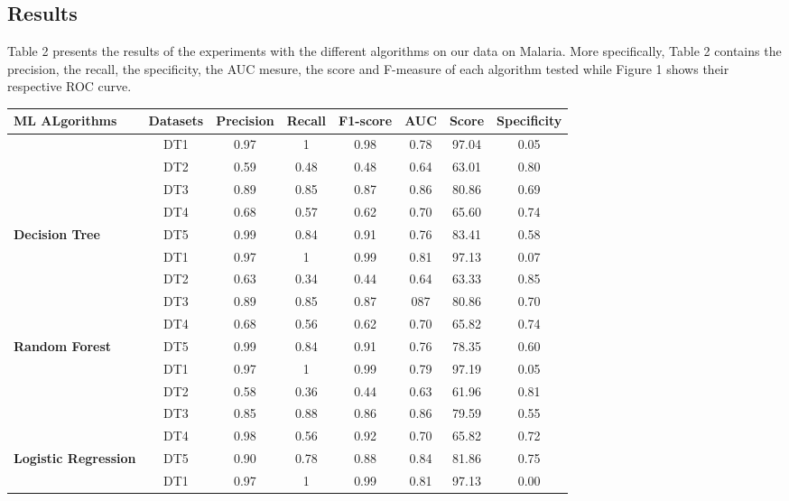 \subsection{Results}
Table 2 presents the results of the experiments with the different algorithms on our data on Malaria. More specifically, Table 2 contains the precision, the recall, the specificity, the AUC mesure, the score and F-measure of each algorithm tested while Figure 1 shows their respective ROC curve.  
\begin{table}
\begin{tabular}{|l|c|c|c|c|c|c|c|}

\hline
\cline{2-8}
 \textbf{ML ALgorithms} &  \textbf{Datasets} & \textbf{Precision} & \textbf{Recall} & \textbf{F1-score}&\textbf{AUC} &\textbf{Score}&\textbf{Specificity}\tabularnewline
\hline
\cline{2-8}
 &  DT1 &0.97  & 1   & 0.98 & 0.78 & 97.04 & 0.05 \\
\cline{2-8}
& DT2 & 0.59 &0.48 &0.48  &0.64  &63.01  &0.80\\
\cline{2-8}
& DT3 &0.89  &0.85 &0.87  &0.86  &80.86  &0.69\\
\cline{2-8}
& DT4 &0.68  &0.57 &0.62  &0.70  &65.60  &0.74\\
\cline{2-8}
\multirow{-4}{*}{ \textbf{Decision Tree}}&   DT5 &0.99  &0.84 &0.91  &0.76  &83.41  &0.58\\
\hline
\cline{2-8}
&DT1 &0.97 &1   &0.99 &0.81 &97.13& 0.07\\
\cline{2-8}
 & DT2 &0.63  & 0.34  &0.44&0.64&63.33& 0.85\\
 \cline{2-8}
 & DT3 &0.89 &0.85 &0.87&087&80.86&0.70\\
 \cline{2-8}
 & DT4 &0.68 &0.56&0.62&0.70&65.82&0.74\\
\cline{2-8}
\multirow{-4}{*}{ \textbf{Random Forest}}&   DT5 &0.99 &0.84&0.91&0.76&78.35&0.60\\
\hline
\cline{2-8}
&DT1 &0.97 &1   &0.99 &0.79 &97.19&0.05 \\
\cline{2-8}
 &DT2 & 0.58 &0.36   &0.44&0.63&61.96&0.81\\
 \cline{2-8}
  &DT3 &0.85 &0.88 &0.86&0.86&79.59&0.55\\
  \cline{2-8}
  &DT4 &0.98 &0.56&0.92&0.70&65.82&0.72\\
  \cline{2-8}
\multirow{-4}{*}{ \textbf{Logistic Regression}}&   DT5 & 0.90&0.78&0.88&0.84&81.86&0.75\\
\hline
\cline{2-8}
& DT1 &0.97 &1   &0.99 &0.81 &97.13 &0.00\\

\end{tabular}
\end{table}
